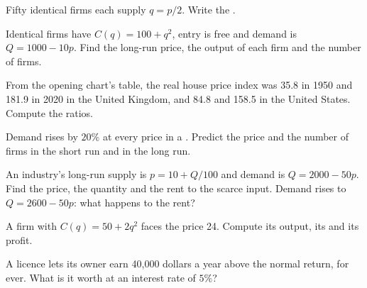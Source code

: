 \begin{exercise}[$\star$]\label{exo:b1:competitive-industry:sum}
Fifty identical firms each supply $q = p/2$. Write the .
\end{exercise}

\begin{exercise}[$\star$]\label{exo:b1:competitive-industry:entry}
Identical firms have $C(q) = 100 + q^2$, entry is free and demand is
$Q = 1000 - 10p$. Find the long-run price, the output of each firm and the
number of firms.
\end{exercise}

\begin{exercise}[$\star$]\label{exo:b1:competitive-industry:read}
From the opening chart's table, the real house price index was 35.8 in
1950 and 181.9 in 2020 in the United Kingdom, and 84.8 and 158.5 in the
United States. %
Compute the ratios.
\end{exercise}

\begin{exercise}[$\star$]\label{exo:b1:competitive-industry:demand-rise}
Demand rises by $20\%$ at every price in a . Predict
the price and the number of firms in the short run and in the long run.
\end{exercise}

\begin{exercise}[$\star\star$]\label{exo:b1:competitive-industry:increasing}
An industry's long-run supply is $p = 10 + Q/100$ and demand is $Q = 2000 - 50p$.
Find the price, the quantity and the rent to the scarce input. Demand rises
to $Q = 2600 - 50p$: what happens to the rent?
\end{exercise}

\begin{exercise}[$\star\star$]\label{exo:b1:competitive-industry:quasi}
A firm with $C(q) = 50 + 2q^2$ faces the price 24. Compute its output, its
 and its profit.
\end{exercise}

\begin{exercise}[$\star\star$]\label{exo:b1:competitive-industry:licence}
A licence lets its owner earn 40,000 dollars a year above the normal return,
for ever. What is it worth at an interest rate of $5\%$?
\end{exercise}

